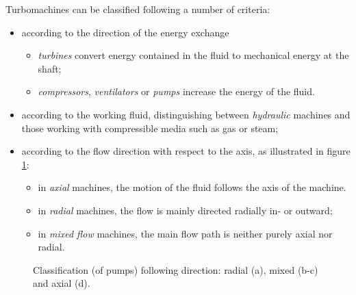 Turbomachines can be classified following a number of criteria:
\begin{itemize}
\item according to the direction of the energy exchange
  \begin{itemize}
  \item \emph{turbines} convert energy contained in the fluid to
    mechanical energy at the shaft;
  \item \emph{compressors}, \emph{ventilators} or \emph{pumps}
    increase the energy of the fluid.
  \end{itemize}
\item according to the working fluid, distinguishing between
  \emph{hydraulic} machines and those working with compressible media
  such as gas or steam;
\item according to the flow direction with respect to the axis, as
  illustrated in figure \ref{fig:axialVsRadial}:
  \begin{itemize}
  \item in \emph{axial} machines, the motion of the fluid follows the
    axis of the machine. 
  \item in \emph{radial} machines, the flow is mainly directed
    radially in- or outward;
  \item in \emph{mixed flow} machines, the main flow path is neither
    purely axial nor radial. 
  \end{itemize}
\end{itemize}
\begin{figure}[!h]
  \caption{Classification (of pumps) following direction: radial (a),
    mixed (b-c) and axial (d).}
  \label{fig:axialVsRadial}
\end{figure}


